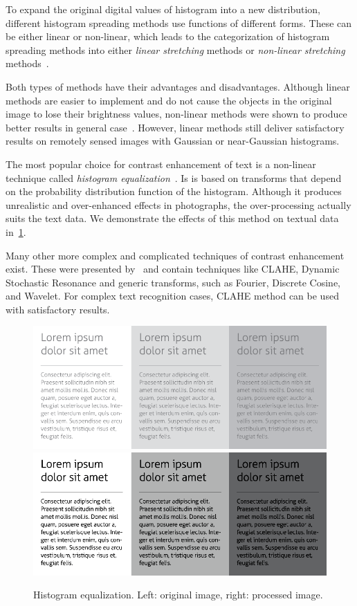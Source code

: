 To expand the original digital values of histogram into a new distribution, different histogram spreading methods use functions of different forms. These can be either linear or non-linear, which leads to the categorization of histogram spreading methods into either \emph{linear stretching} methods or \emph{non-linear stretching} methods~\citep{linearNonStretch}.

Both types of methods have their advantages and disadvantages. Although linear methods are easier to implement and do not cause the objects in the original image to lose their brightness values, non-linear methods were shown to produce better results in general case~\citep{chandpa1comparative}. However, linear methods still deliver satisfactory results on remotely sensed images with Gaussian or near-Gaussian histograms.

The most popular choice for contrast enhancement of text is a non-linear technique called \emph{histogram equalization}~\citep{histogramEQ}. Is is based on transforms that depend on the probability distribution function of the histogram. Although it produces unrealistic and over-enhanced effects in photographs, the over-processing actually suits the text data. We demonstrate the effects of this method on textual data in~\cref{fig:preprocessHistogramEqualization}.

Many other more complex and complicated techniques of contrast enhancement exist. These were presented by~\citet{contrastOther} and contain techniques like CLAHE, Dynamic Stochastic Resonance and generic transforms, such as Fourier, Discrete Cosine, and Wavelet. For complex text recognition cases, CLAHE method can be used with satisfactory results.

\begin{figure}[t]
\centering
\includegraphics[width=0.4\linewidth]{img/preprocessing/contrast_low.png}
\qquad
\includegraphics[width=0.4\linewidth]{img/preprocessing/contrast_high.png}
\caption{Histogram equalization. Left: original image, right: processed image.}
\label{fig:preprocessHistogramEqualization}
\end{figure}

